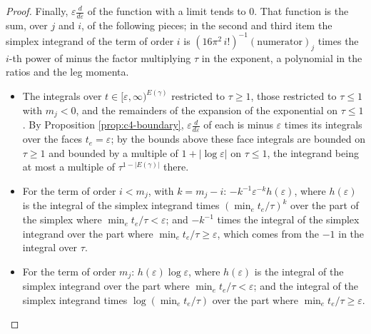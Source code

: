 \begin{proof}
Finally, $\varepsilon\frac{d}{d\varepsilon}$ of the function with a limit tends to $0$. That function is the sum, over $j$ and $i$, of the following pieces; in the second and third item the simplex integrand of the term of order $i$ is $(16\pi^2\,i!)^{-1}(\text{numerator})_j$ times the $i$-th power of minus the factor multiplying $\tau$ in the exponent, a polynomial in the ratios and the leg momenta.
\begin{itemize}
\item The integrals over $t\in[\varepsilon,\infty)^{E(\gamma)}$ restricted to $\tau\ge1$, those restricted to $\tau\le1$ with $m_j<0$, and the remainders of the expansion of the exponential on $\tau\le1$. By Proposition \ref{prop:c4-boundary}, $\varepsilon\frac{d}{d\varepsilon}$ of each is minus $\varepsilon$ times its integrals over the faces $t_e=\varepsilon$; by the bounds above these face integrals are bounded on $\tau\ge1$ and bounded by a multiple of $1+|\log\varepsilon|$ on $\tau\le1$, the integrand being at most a multiple of $\tau^{1-|E(\gamma)|}$ there.
\item For the term of order $i<m_j$, with $k=m_j-i$: $-k^{-1}\varepsilon^{-k}h(\varepsilon)$, where $h(\varepsilon)$ is the integral of the simplex integrand times $(\min_et_e/\tau)^k$ over the part of the simplex where $\min_et_e/\tau<\varepsilon$; and $-k^{-1}$ times the integral of the simplex integrand over the part where $\min_et_e/\tau\ge\varepsilon$, which comes from the $-1$ in the integral over $\tau$.
\item For the term of order $m_j$: $h(\varepsilon)\log\varepsilon$, where $h(\varepsilon)$ is the integral of the simplex integrand over the part where $\min_et_e/\tau<\varepsilon$; and the integral of the simplex integrand times $\log(\min_et_e/\tau)$ over the part where $\min_et_e/\tau\ge\varepsilon$.
\end{itemize}

\end{proof}
